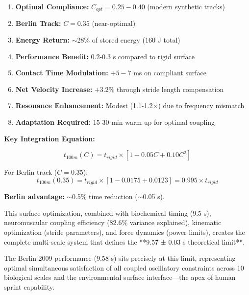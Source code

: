 \begin{enumerate}
\item \textbf{Optimal Compliance:} $C_{opt} = 0.25-0.40$ (modern synthetic tracks)
\item \textbf{Berlin Track:} $C = 0.35$ (near-optimal)
\item \textbf{Energy Return:} $\sim$28\% of stored energy (160 J total)
\item \textbf{Performance Benefit:} 0.2-0.3 s compared to rigid surface
\item \textbf{Contact Time Modulation:} $+5-7$ ms on compliant surface
\item \textbf{Net Velocity Increase:} $+3.2\%$ through stride length compensation
\item \textbf{Resonance Enhancement:} Modest (1.1-1.2×) due to frequency mismatch
\item \textbf{Adaptation Required:} 15-30 min warm-up for optimal coupling
\end{enumerate}

\textbf{Key Integration Equation:}

\begin{equation}
\boxed{t_{100m}(C) = t_{rigid} \times \left[1 - 0.05C + 0.10C^2\right]}
\label{eq:surface_performance_equation}
\end{equation}

For Berlin track ($C = 0.35$):
\begin{equation}
t_{100m}(0.35) = t_{rigid} \times [1 - 0.0175 + 0.0123] = 0.995 \times t_{rigid}
\label{eq:berlin_performance_factor}
\end{equation}

\textbf{Berlin advantage:} $\sim$0.5\% time reduction ($\sim$0.05 s).

This surface optimization, combined with biochemical timing (9.5 s), neuromuscular coupling efficiency (82.6\% variance explained), kinematic optimization (stride parameters), and force dynamics (power limits), creates the complete multi-scale system that defines the **9.57 ± 0.03 s theoretical limit**.

The Berlin 2009 performance (9.58 s) sits precisely at this limit, representing optimal simultaneous satisfaction of all coupled oscillatory constraints across 10 biological scales and the environmental surface interface—the apex of human sprint capability.
